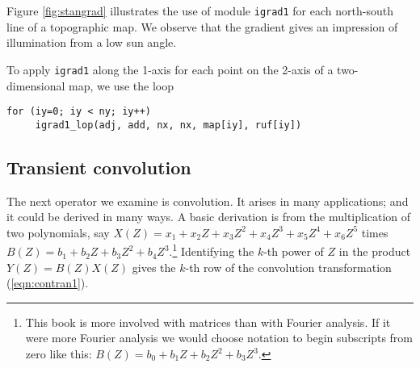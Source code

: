
\par
Figure \ref{fig:stangrad} illustrates the use of module
\texttt{igrad1} for each north-south line of a topographic map.  We
observe that the gradient gives an impression of illumination from a
low sun angle.


To apply \texttt{igrad1} along the 1-axis for each point on the 2-axis
of a two-dimensional map, we use the loop
\begin{verbatim}
for (iy=0; iy < ny; iy++) 
     igrad1_lop(adj, add, nx, nx, map[iy], ruf[iy])
\end{verbatim}
\begin{comment}
On the other hand, to see the east-west gradient, we use the loop
\begin{verbatim}
do ix=1,nx 
      stat = igrad1_lop( adj, add, map(ix,:), ruf(ix,:))
\end{verbatim}
\end{comment}



\subsection{Transient convolution}

\par
The next operator we examine is convolution.
It arises in many applications; and it could be derived in many ways.
A basic derivation is from the multiplication of two polynomials, say
$X(Z) = x_1 + x_2 Z + x_3 Z^2 + x_4 Z^3 + x_5 Z^4 + x_6 Z^5$ times
$B(Z) = b_1 + b_2 Z + b_3 Z^2 + b_4 Z^3$.\footnote{
	This book is more involved with matrices than with Fourier analysis.
	If it were more Fourier analysis we would choose notation
	to begin subscripts from zero like this:
	$B(Z) = b_0 + b_1 Z + b_2 Z^2 + b_3 Z^3$.}
Identifying the $k$-th power of $Z$ in the product
$Y(Z)=B(Z)X(Z)$ gives the $k$-th row of the convolution transformation
(\ref{eqn:contran1}).

